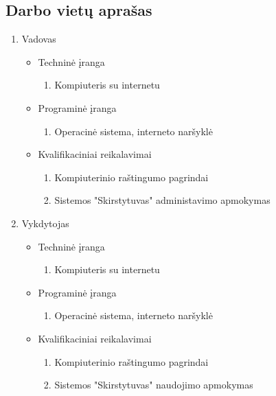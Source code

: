\subsection{Darbo vietų aprašas}
\begin{enumerate}
  \item Vadovas
	\begin{itemize}
	  \item Techninė įranga
		\begin{enumerate}
			\item Kompiuteris su internetu
		\end{enumerate}
	  \item Programinė įranga
		\begin{enumerate}
			\item Operacinė sistema, interneto naršyklė
		\end{enumerate}
	  \item Kvalifikaciniai reikalavimai
		\begin{enumerate}
			\item Kompiuterinio raštingumo pagrindai
			\item Sistemos "Skirstytuvas" administavimo apmokymas %
		\end{enumerate}
	\end{itemize}

  \item Vykdytojas
	\begin{itemize}
	  \item Techninė įranga
		\begin{enumerate}
			\item Kompiuteris su internetu
		\end{enumerate}
	  \item Programinė įranga
		\begin{enumerate}
			\item Operacinė sistema, interneto naršyklė
		\end{enumerate}
	  \item Kvalifikaciniai reikalavimai
		\begin{enumerate}
			\item Kompiuterinio raštingumo pagrindai
			\item Sistemos "Skirstytuvas" naudojimo apmokymas
		\end{enumerate}
	\end{itemize}
\end{enumerate}


